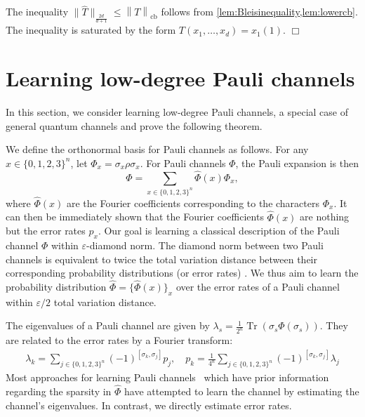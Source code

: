 \documentclass[11pt]{article}
\newcommand{\norm}[1]{\left\|{#1}\right\|}
\newcommand{\eps}{\varepsilon}
\theoremstyle{plain}
\DeclareMathOperator{\cb}{cb}
\renewcommand{\cb}{{\mathrm{cb}}}
\DeclareMathOperator{\Tr}{Tr}
\theoremstyle{plain}
\theoremstyle{definition}
\theoremstyle{remark}
\renewenvironment{proof}[1][]{
    \begin{trivlist}
    \item[\hspace{\labelsep}{\em\noindent Proof#1:\/}]}
    {{\hfill$\Box$}
    \end{trivlist}
}
\theoremstyle{named}
\begin{document}
\begin{proof}[ of \cref{theo:BHGf}]
    The inequality $\|\widehat{T}\|_{\frac{2d}{d+1}}\leq\norm{T}_{\cb}$ follows from \cref{lem:Bleisinequality,lem:lowercb}. The inequality is saturated by the form $T(x_1,\dots,x_d)=x_1(1).$ 
\end{proof}








\appendix
\section{Learning low-degree Pauli channels}
In this section, we consider learning low-degree Pauli channels, a special case of general quantum channels and prove the following theorem.
\learnPauliChannels*

We define the orthonormal basis for Pauli channels as follows. For any $x \in \{0,1,2,3\}^n$, let $\Phi_x = \sigma_x \rho \sigma_x$. For Pauli channels $\Phi$, the Pauli expansion is then
\begin{equation}
    \Phi = \sum_{x \in \{0,1,2,3\}^n} \widehat{\Phi}(x) \Phi_x,
\end{equation}
where $\widehat{\Phi}(x)$ are the Fourier coefficients corresponding to the characters $\Phi_x$. It can then be immediately shown that the Fourier coefficients $\widehat{\Phi}(x)$ are nothing but the error rates $p_x$. Our goal is learning a classical description of the Pauli channel $\Phi$ within $\eps$-diamond norm. The diamond norm between two Pauli channels is equivalent to twice the total variation distance between their corresponding probability distributions (or error rates) \cite{magesan2012character}. We thus aim to learn the probability distribution $\widehat{\Phi} = \{ \widehat{\Phi}(x) \}_x$ over the error rates of a Pauli channel within $\eps/2$ total variation distance.

The eigenvalues of a Pauli channel are given by $\lambda_s = \frac{1}{2^n} \Tr(\sigma_s \Phi(\sigma_s))$. They are related to the error rates by a Fourier transform:
\begin{align}
    \lambda_k = \sum_{j \in \{0,1,2,3\}^n} (-1)^{[\sigma_k, \sigma_j]} p_j, \quad
    p_k = \frac{1}{4^n} \sum_{j \in \{0,1,2,3\}^n} (-1)^{[\sigma_k, \sigma_j]} \lambda_j
\end{align}
Most approaches for learning Pauli channels~\cite{flammia2020efficient,harper2021fast} which have prior information regarding the sparsity in $\widehat{\Phi}$ have attempted to learn the channel by estimating the channel's eigenvalues. In contrast, we directly estimate error rates.
\end{document}
